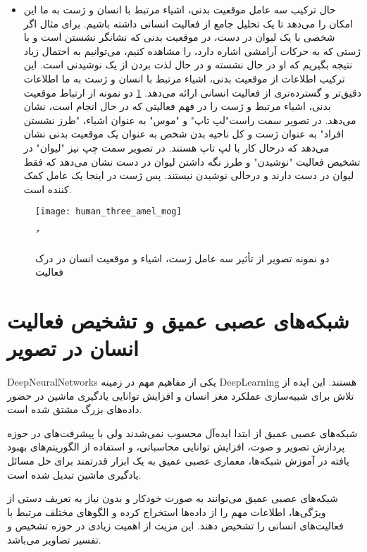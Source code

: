 \begin{itemize}
	\item
	حال ترکیب سه عامل موقعیت بدنی، اشیاء مرتبط با انسان و ژست به ما این امکان را می‌دهد تا یک تحلیل جامع از فعالیت انسانی داشته باشیم. برای مثال اگر شخصی با یک لیوان در دست، در موقعیت بدنی که نشانگر نشستن است و با ژستی که به حرکات آرامشی اشاره دارد، را مشاهده کنیم، می‌توانیم به احتمال زیاد نتیجه بگیریم که او در حال نشسته و در حال لذت بردن از یک نوشیدنی است. این ترکیب اطلاعات از موقعیت بدنی، اشیاء مرتبط با انسان و ژست به ما اطلاعات دقیق‌تر و گسترده‌تری از فعالیت انسانی ارائه می‌دهد. 
\ref{fig:human_three_amel_mog}
دو نمونه از ارتباط موقعیت بدنی، اشیاء مرتبط و ژست را در فهم فعالیتی که در حال انجام است، نشان می‌دهد. در تصویر سمت  راست"لپ تاپ" و "موس" به عنوان اشیاء، "طرز نشستن افراد" به عنوان ژست و کل ناحیه بدن شخص به عنوان یک موقعیت بدنی نشان می‌دهد که درحال کار با لپ تاپ هستند. در تصویر سمت چپ نیز "لیوان" در تشخیص فعالیت "نوشیدن" و طرز نگه داشتن لیوان در دست نشان می‌دهد که فقط لیوان در دست دارند و درحالی نوشیدن نیستند. پس ژست در اینجا یک عامل کمک کننده است.
\end{itemize}
\vspace{8pt}
\begin{figure}[ht]
	\centerline{\texttt{[image: human\_three\_amel\_mog]}}
	\caption[دو نمونه تصویر از تأثیر سه عامل ژست، اشیاء و موقعیت انسان در درک فعالیت]{دو نمونه تصویر از تأثیر سه عامل ژست، اشیاء و موقعیت انسان در درک فعالیت
		\cite{tasvirSevomChapterYek}
	}ُ
	\label{fig:human_three_amel_mog}
\end{figure}
\vspace{20pt}

\section{شبکه‌های عصبی عمیق و تشخیص فعالیت انسان در تصویر}

\gls{DeepNeuralNetworks}
 یکی از مفاهیم مهم در زمینه %
\gls{DeepLearning}
  هستند. این ایده از تلاش برای شبیه‌سازی عملکرد مغز انسان و افزایش توانایی یادگیری ماشین در حضور داده‌های بزرگ مشتق شده است.

شبکه‌های عصبی عمیق از ابتدا ایده‌آل محسوب نمی‌شدند ولی با پیشرفت‌های در حوزه پردازش تصویر و صوت، افزایش توانایی محاسباتی، و استفاده از الگوریتم‌های بهبود یافته در آموزش شبکه‌ها، معماری عصبی عمیق به یک ابزار قدرتمند برای حل مسائل یادگیری ماشین تبدیل شده است.

شبکه‌های عصبی عمیق می‌توانند به صورت خودکار و بدون نیاز به تعریف دستی از ویژگی‌ها، اطلاعات مهم را از داده‌ها استخراج کرده و الگوهای مختلف مرتبط با فعالیت‌های انسانی را تشخیص دهند. این مزیت از اهمیت زیادی در حوزه تشخیص و تفسیر تصاویر می‌باشد.

